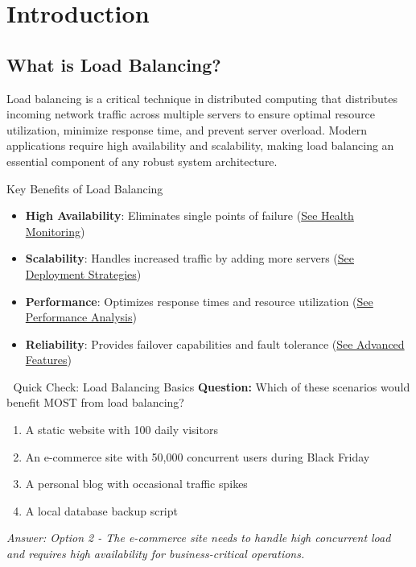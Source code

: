 \documentclass[12pt,a4paper]{article}
\begin{document}
\section{Introduction}

\subsection{What is Load Balancing?}

Load balancing is a critical technique in distributed computing that distributes incoming network traffic across multiple servers to ensure optimal resource utilization, minimize response time, and prevent server overload. Modern applications require high availability and scalability, making load balancing an essential component of any robust system architecture.

\begin{infobox}{Key Benefits of Load Balancing}
\begin{itemize}
    \item \textbf{High Availability}: Eliminates single points of failure (\hyperref[sec:health]{See Health Monitoring})
    \item \textbf{Scalability}: Handles increased traffic by adding more servers (\hyperref[sec:deployment]{See Deployment Strategies})
    \item \textbf{Performance}: Optimizes response times and resource utilization (\hyperref[sec:performance]{See Performance Analysis})
    \item \textbf{Reliability}: Provides failover capabilities and fault tolerance (\hyperref[sec:advanced]{See Advanced Features})
\end{itemize}
\end{infobox}

\begin{quizbox}{🤔 Quick Check: Load Balancing Basics}
\textbf{Question:} Which of these scenarios would benefit MOST from load balancing?
\begin{enumerate}
    \item A static website with 100 daily visitors
    \item An e-commerce site with 50,000 concurrent users during Black Friday
    \item A personal blog with occasional traffic spikes
    \item A local database backup script
\end{enumerate}
\textit{Answer: Option 2 - The e-commerce site needs to handle high concurrent load and requires high availability for business-critical operations.}
\end{quizbox}
\end{document}
